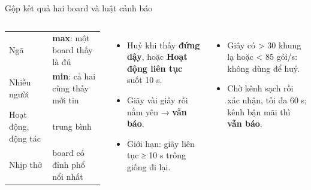 \documentclass[aspectratio=169,10pt]{beamer}
\begin{document}
\begin{frame}{Gộp kết quả hai board và luật cảnh báo}
  \begin{columns}[T,onlytextwidth]
      \small
      \centering
      \vskip3mm\raggedright
      \renewcommand{\arraystretch}{1.15}\scriptsize
      \begin{tabularx}{\linewidth}{@{}>{\raggedright}p{26mm} L@{}}
        \toprule
         &  \\
        \midrule
        Ngã & \textbf{max}: một board thấy là đủ \\\addlinespace[1mm]
        Nhiều người & \textbf{min}: cả hai cùng thấy mới tin \\\addlinespace[1mm]
        Hoạt động, động tác & trung bình \\\addlinespace[1mm]
        Nhịp thở & board có đỉnh phổ nổi nhất \\
        \bottomrule
      \end{tabularx}
      \small
      \begin{itemize}
        \item Huỷ khi thấy \textbf{đứng dậy}, hoặc \textbf{Hoạt động liên tục} suốt 10 s.
        \item Giãy vài giây rồi nằm yên → \textbf{vẫn báo}.
        \item Giới hạn: giãy liên tục ≥ 10 s trông giống đi lại.
      \end{itemize}
      \vskip3mm
      \begin{itemize}
        \item Giây có > 30 khung lạ hoặc < 85 gói/s: không dùng để huỷ.
        \item Chờ kênh sạch rồi xác nhận, tối đa 60 s; kênh bận mãi thì \textbf{vẫn báo}.
      \end{itemize}
  \end{columns}
\end{frame}
\end{document}
